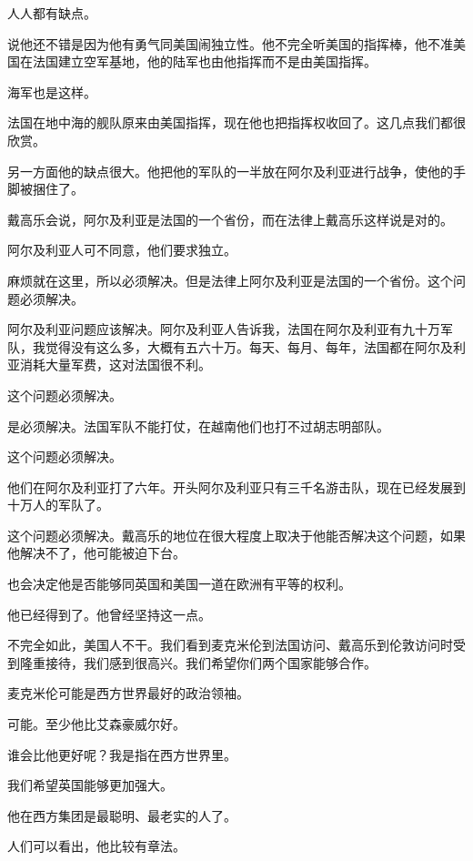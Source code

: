 人人都有缺点。

说他还不错是因为他有勇气同美国闹独立性。他不完全听美国的指挥棒，他不准美国在法国建立空军基地，他的陆军也由他指挥而不是由美国指挥。

海军也是这样。

法国在地中海的舰队原来由美国指挥，现在他也把指挥权收回了。这几点我们都很欣赏。

另一方面他的缺点很大。他把他的军队的一半放在阿尔及利亚进行战争，使他的手脚被捆住了。

戴高乐会说，阿尔及利亚是法国的一个省份，而在法律上戴高乐这样说是对的。

阿尔及利亚人可不同意，他们要求独立。

麻烦就在这里，所以必须解决。但是法律上阿尔及利亚是法国的一个省份。这个问题必须解决。

阿尔及利亚问题应该解决。阿尔及利亚人告诉我，法国在阿尔及利亚有九十万军队，我觉得没有这么多，大概有五六十万。每天、每月、每年，法国都在阿尔及利亚消耗大量军费，这对法国很不利。

这个问题必须解决。

是必须解决。法国军队不能打仗，在越南他们也打不过胡志明部队。

这个问题必须解决。

他们在阿尔及利亚打了六年。开头阿尔及利亚只有三千名游击队，现在已经发展到十万人的军队了。

这个问题必须解决。戴高乐的地位在很大程度上取决于他能否解决这个问题，如果他解决不了，他可能被迫下台。

也会决定他是否能够同英国和美国一道在欧洲有平等的权利。

他已经得到了。他曾经坚持这一点。

不完全如此，美国人不干。我们看到麦克米伦到法国访问、戴高乐到伦敦访问时受到隆重接待，我们感到很高兴。我们希望你们两个国家能够合作。

麦克米伦可能是西方世界最好的政治领袖。

可能。至少他比艾森豪威尔好。

谁会比他更好呢？我是指在西方世界里。

我们希望英国能够更加强大。

他在西方集团是最聪明、最老实的人了。

人们可以看出，他比较有章法。

